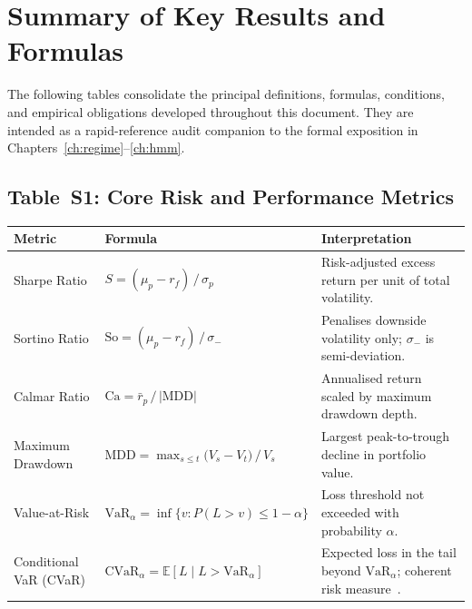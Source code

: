 \documentclass[12pt,openany]{book}
\numberwithin{equation}{chapter}
\theoremstyle{plain}
\theoremstyle{definition}
\theoremstyle{remark}
\numberwithin{equation}{chapter}
\theoremstyle{plain}
\begin{document}
\chapter*{Summary of Key Results and Formulas}

\noindent The following tables consolidate the principal definitions,
formulas, conditions, and empirical obligations developed throughout
this document. They are intended as a rapid-reference audit companion
to the formal exposition in Chapters~\ref{ch:regime}--\ref{ch:hmm}.

\section*{Table~S1: Core Risk and Performance Metrics}

\begin{center}
\begin{tabularx}{\textwidth}{@{} l X X @{}}
\hline
\textbf{Metric} & \textbf{Formula} & \textbf{Interpretation} \\
\hline
Sharpe Ratio &
  $S = (\mu_p - r_f)\,/\,\sigma_p$ &
  Risk-adjusted excess return per unit of total volatility. \\
\addlinespace
Sortino Ratio &
  $\mathrm{So} = (\mu_p - r_f)\,/\,\sigma_{\!-}$ &
  Penalises downside volatility only; $\sigma_{-}$ is semi-deviation. \\
\addlinespace
Calmar Ratio &
  $\mathrm{Ca} = \bar{r}_p\,/\,|\mathrm{MDD}|$ &
  Annualised return scaled by maximum drawdown depth. \\
\addlinespace
Maximum Drawdown &
  $\mathrm{MDD} = \max_{s\le t}\bigl(V_s - V_t\bigr)\,/\,V_s$ &
  Largest peak-to-trough decline in portfolio value. \\
\addlinespace
Value-at-Risk &
  $\mathrm{VaR}_{\alpha} = \inf\{v : P(L > v) \le 1-\alpha\}$ &
  Loss threshold not exceeded with probability $\alpha$. \\
\addlinespace
Conditional VaR (CVaR) &
  $\mathrm{CVaR}_{\alpha} = \mathbb{E}[L \mid L > \mathrm{VaR}_{\alpha}]$ &
  Expected loss in the tail beyond \(\mathrm{VaR}_{\alpha}\); coherent risk measure~\cite{R5}. \\
\hline
\end{tabularx}
\end{center}
\end{document}
